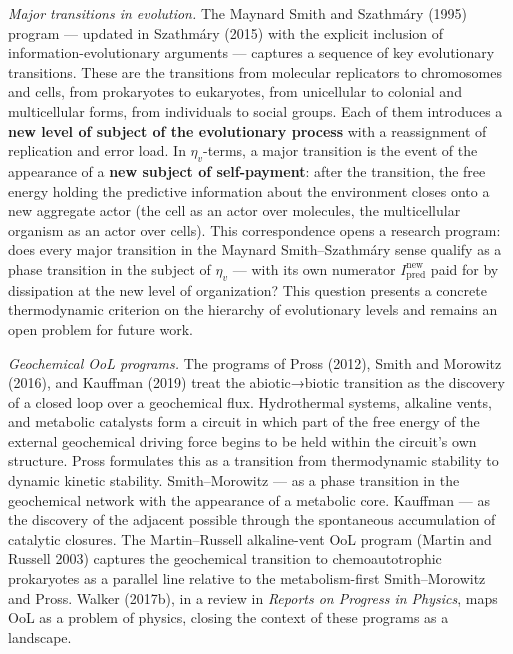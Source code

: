 \documentclass[pdflatex,sn-mathphys-ay]{sn-jnl}
\begin{document}
\emph{Major transitions in evolution.} The Maynard Smith and Szathmáry (1995) program --- updated in Szathmáry (2015) with the explicit inclusion of information-evolutionary arguments --- captures a sequence of key evolutionary transitions. These are the transitions from molecular replicators to chromosomes and cells, from prokaryotes to eukaryotes, from unicellular to colonial and multicellular forms, from individuals to social groups. Each of them introduces a \textbf{new level of subject of the evolutionary process} with a reassignment of replication and error load. In \(\eta_v\)-terms, a major transition is the event of the appearance of a \textbf{new subject of self-payment}: after the transition, the free energy holding the predictive information about the environment closes onto a new aggregate actor (the cell as an actor over molecules, the multicellular organism as an actor over cells). This correspondence opens a research program: does every major transition in the Maynard Smith--Szathmáry sense qualify as a phase transition in the subject of \(\eta_v\) --- with its own numerator \(I_{\text{pred}}^{\text{new}}\) paid for by dissipation at the new level of organization? This question presents a concrete thermodynamic criterion on the hierarchy of evolutionary levels and remains an open problem for future work.

\emph{Geochemical OoL programs.} The programs of Pross (2012), Smith and Morowitz (2016), and Kauffman (2019) treat the abiotic→biotic transition as the discovery of a closed loop over a geochemical flux. Hydrothermal systems, alkaline vents, and metabolic catalysts form a circuit in which part of the free energy of the external geochemical driving force begins to be held within the circuit's own structure. Pross formulates this as a transition from thermodynamic stability to dynamic kinetic stability. Smith--Morowitz --- as a phase transition in the geochemical network with the appearance of a metabolic core. Kauffman --- as the discovery of the adjacent possible through the spontaneous accumulation of catalytic closures. The Martin--Russell alkaline-vent OoL program (Martin and Russell 2003) captures the geochemical transition to chemoautotrophic prokaryotes as a parallel line relative to the metabolism-first Smith--Morowitz and Pross. Walker (2017b), in a review in \emph{Reports on Progress in Physics}, maps OoL as a problem of physics, closing the context of these programs as a landscape.
\end{document}

